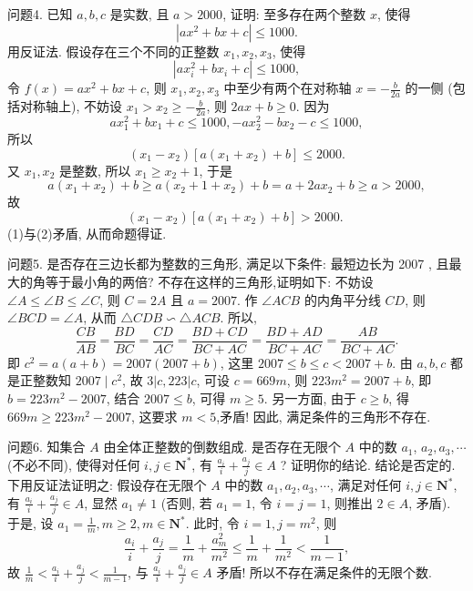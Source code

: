 问题4. 已知 $a, b, c$ 是实数, 且 $a>2000$, 证明: 至多存在两个整数 $x$, 使得
$$
\left|a x^2+b x+c\right| \leqslant 1000 .
$$
用反证法.
假设存在三个不同的正整数 $x_1, x_2, x_3$, 使得
$$
\left|a x_i^2+b x_i+c\right| \leqslant 1000,
$$
令 $f(x)=a x^2+b x+c$, 则 $x_1, x_2, x_3$ 中至少有两个在对称轴 $x=-\frac{b}{2 a}$ 的一侧 (包括对称轴上), 不妨设 $x_1>x_2 \geqslant-\frac{b}{2 a}$, 则 $2 a x+b \geqslant 0$. 因为
$$
a x_1^2+b x_1+c \leqslant 1000,-a x_2^2-b x_2-c \leqslant 1000,
$$
所以
$$
\left(x_1-x_2\right)\left[a\left(x_1+x_2\right)+b\right] \leqslant 2000 .
$$
又 $x_1, x_2$ 是整数, 所以 $x_1 \geqslant x_2+1$, 于是
$$
a\left(x_1+x_2\right)+b \geqslant a\left(x_2+1+x_2\right)+b=a+2 a x_2+b \geqslant a>2000,
$$
故
$$
\left(x_1-x_2\right)\left[a\left(x_1+x_2\right)+b\right]>2000 \text {. }
$$
(1)与(2)矛盾, 从而命题得证.



问题5. 是否存在三边长都为整数的三角形, 满足以下条件: 最短边长为 2007 , 且最大的角等于最小角的两倍?
不存在这样的三角形,证明如下:
不妨设 $\angle A \leqslant \angle B \leqslant \angle C$, 则 $C=2 A$ 且 $a=2007$. 作 $\angle A C B$ 的内角平分线 $C D$, 则 $\angle B C D=\angle A$, 从而 $\triangle C D B \backsim \triangle A C B$. 所以,
$$
\frac{C B}{A B}=\frac{B D}{B C}=\frac{C D}{A C}=\frac{B D+C D}{B C+A C}=\frac{B D+A D}{B C+A C}=\frac{A B}{B C+A C} .
$$
即 $c^2=a(a+b)=2007(2007+b)$, 这里 $2007 \leqslant b \leqslant c<2007+b$.
由 $a, b, c$ 都是正整数知 $2007 \mid c^2$, 故 $3|c, 223| c$, 可设 $c=669 m$, 则 $223 m^2=2007+b$, 即 $b=223 m^2-2007$, 结合 $2007 \leqslant b$, 可得 $m \geqslant 5$.
另一方面, 由于 $c \geqslant b$, 得 $669 m \geqslant 223 m^2-2007$, 这要求 $m<5$,矛盾! 因此, 满足条件的三角形不存在.



问题6. 知集合 $A$ 由全体正整数的倒数组成.
是否存在无限个 $A$ 中的数 $a_1$, $a_2, a_3, \cdots$ (不必不同), 使得对任何 $i, j \in \mathbf{N}^*$, 有 $\frac{a_i}{i}+\frac{a_j}{j} \in A$ ? 证明你的结论.
结论是否定的.
下用反证法证明之:
假设存在无限个 $A$ 中的数 $a_1, a_2, a_3, \cdots$, 满足对任何 $i, j \in \mathbf{N}^*$, 有 $\frac{a_i}{i}+\frac{a_j}{j} \in A$, 显然 $a_1 \neq 1$ (否则, 若 $a_1=1$, 令 $i=j=1$, 则推出 $2 \in A$, 矛盾).
于是, 设 $a_1=\frac{1}{m}, m \geqslant 2, m \in \mathbf{N}^*$.
此时, 令 $i=1, j=m^2$, 则
$$
\frac{a_i}{i}+\frac{a_j}{j}=\frac{1}{m}+\frac{a_m^2}{m^2} \leqslant \frac{1}{m}+\frac{1}{m^2}<\frac{1}{m-1},
$$
故 $\frac{1}{m}<\frac{a_i}{i}+\frac{a_j}{j}<\frac{1}{m-1}$, 与 $\frac{a_i}{i}+\frac{a_j}{j} \in A$ 矛盾!
所以不存在满足条件的无限个数.



